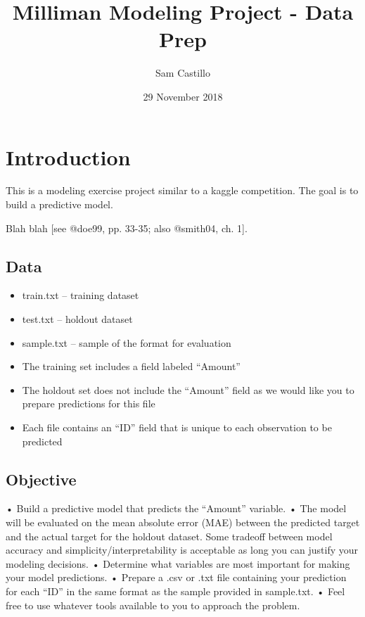 \documentclass[]{article}
\title{Milliman Modeling Project - Data Prep}
\author{Sam Castillo}
\date{29 November 2018}
\providecommand{\tightlist}{%
  \setlength{\itemsep}{0pt}\setlength{\parskip}{0pt}}
\begin{document}
\maketitle

{
\setcounter{tocdepth}{2}
\tableofcontents
}
\section{Introduction}\label{introduction}

This is a modeling exercise project similar to a kaggle competition. The
goal is to build a predictive model.

Blah blah {[}see @doe99, pp. 33-35; also @smith04, ch. 1{]}.

\subsection{Data}\label{data}

\begin{itemize}
\tightlist
\item
  train.txt -- training dataset
\item
  test.txt -- holdout dataset
\item
  sample.txt -- sample of the format for evaluation
\item
  The training set includes a field labeled ``Amount''
\item
  The holdout set does not include the ``Amount'' field as we would like
  you to prepare predictions for this file
\item
  Each file contains an ``ID'' field that is unique to each observation
  to be predicted
\end{itemize}

\subsection{Objective}\label{objective}

• Build a predictive model that predicts the ``Amount'' variable. • The
model will be evaluated on the mean absolute error (MAE) between the
predicted target and the actual target for the holdout dataset. Some
tradeoff between model accuracy and simplicity/interpretability is
acceptable as long you can justify your modeling decisions. • Determine
what variables are most important for making your model predictions. •
Prepare a .csv or .txt file containing your prediction for each ``ID''
in the same format as the sample provided in sample.txt. • Feel free to
use whatever tools available to you to approach the problem.
\end{document}
